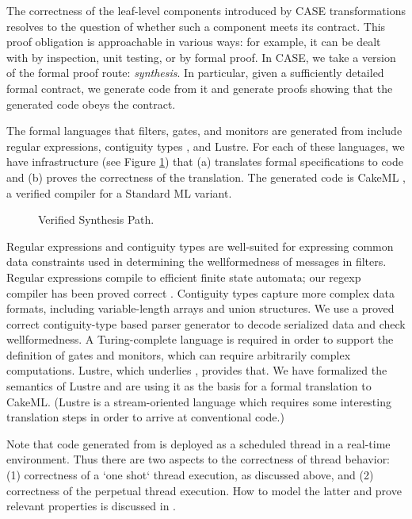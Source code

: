 The correctness of the leaf-level components introduced by CASE
transformations resolves to the question of whether such a component
meets its \agree{} contract. This proof obligation is approachable in
various ways: for example, it can be dealt with by inspection, unit
testing, or by formal proof. In CASE, we take a version of the formal
proof route: \emph{synthesis}. In particular, given a sufficiently
detailed formal contract, we generate code from it and generate proofs
showing that the generated code obeys the contract.

The formal languages that filters, gates, and monitors are generated
from include regular expressions, contiguity types
\cite{contiguity-types}, and Lustre\cite{lustre}. For each of these
languages, we have infrastructure (see Figure \ref{fig:synthesis})
that (a) translates formal specifications to code and (b) proves the
correctness of the translation. The generated code is CakeML
\cite{cakeml}, a verified compiler for a Standard ML variant.

\begin{figure}[h]
\begin{center}
\end{center}
\caption{Verified Synthesis Path.\label{fig:synthesis}}
\end{figure}

Regular expressions and contiguity types are well-suited for
expressing common data constraints used in determining the
wellformedness of messages in filters. Regular expressions compile to
efficient finite state automata; our regexp compiler has been proved
correct \cite{case-verified-filter}. Contiguity types capture more
complex data formats, including variable-length arrays and union
structures. We use a proved correct contiguity-type based parser
generator to decode serialized data and check wellformedness. A
Turing-complete language is required in order to support the
definition of gates and monitors, which can require arbitrarily
complex computations. Lustre, which underlies \agree{}, provides
that. We have formalized the semantics of Lustre and are using it as
the basis for a formal translation to CakeML. (Lustre is a
stream-oriented language which requires some interesting translation
steps in order to arrive at conventional code.)

Note that code generated from \splat{} is deployed as a scheduled
thread in a real-time environment. Thus there are two aspects to the
correctness of thread behavior: (1) correctness of a `one shot` thread
execution, as discussed above, and (2) correctness of the perpetual
thread execution. How to model the latter and prove relevant
properties is discussed in \cite{johannes:repeat}.
